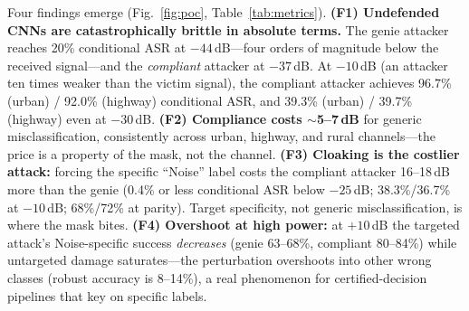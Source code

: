 \documentclass[review]{elsarticle}
\begin{document}
Four findings emerge (Fig.~\ref{fig:poc}, Table~\ref{tab:metrics}).
\textbf{(F1) Undefended CNNs are catastrophically
brittle in absolute terms.} The genie attacker reaches 20\% conditional ASR
at $-44$\,dB---four orders of magnitude below the received signal---and the
\emph{compliant} attacker at $-37$\,dB. At $-10$\,dB (an attacker ten times
weaker than the victim signal), the compliant attacker achieves 96.7\%
(urban) / 92.0\% (highway) conditional ASR, and 39.3\% (urban) /
39.7\% (highway) even at $-30$\,dB. \textbf{(F2) Compliance costs
${\sim}$5--7\,dB} for generic misclassification, consistently across urban,
highway, and rural channels---the price is a property of the mask, not the
channel. \textbf{(F3) Cloaking is the costlier attack:} forcing the specific
``Noise'' label costs the compliant attacker 16--18\,dB more than the genie
(0.4\% or less conditional ASR below $-25$\,dB; 38.3\%/36.7\% at
$-10$\,dB; 68\%/72\% at parity).
Target specificity, not generic misclassification, is where the mask bites.
\textbf{(F4) Overshoot at high power:} at $+10$\,dB the targeted attack's
Noise-specific success \emph{decreases} (genie 63--68\%, compliant
80--84\%) while untargeted damage saturates---the perturbation overshoots
into other wrong classes (robust accuracy is 8--14\%), a real phenomenon for certified-decision pipelines
that key on specific labels.
\end{document}
